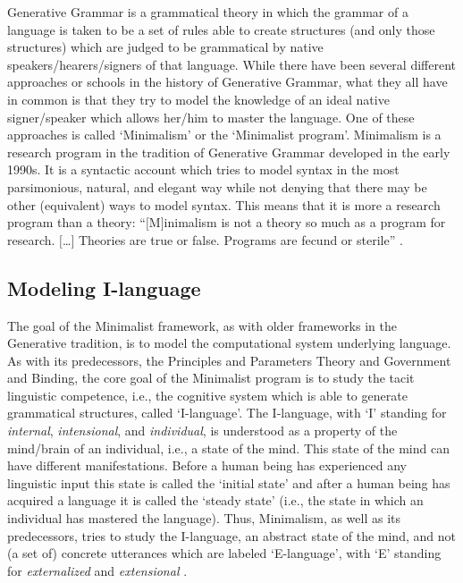 Generative Grammar is a grammatical theory in which the grammar of a language is taken to be a set of rules able to create structures (and only those structures) which are judged to be grammatical by native speakers/hearers/signers of that language. While there have been several different approaches or schools in the history of Generative Grammar, what they all have in common is that they try to model the knowledge of an ideal native signer/speaker which allows her/him to master the language. One of these approaches is called `Minimalism' or the `Minimalist program'. Minimalism is a research program in the tradition of Generative Grammar developed in the early 1990s. It is a syntactic account which tries to model syntax in the most parsimonious, natural, and elegant way while not denying that there may be other (equivalent) ways to model syntax. This means that it is more a research program than a theory: ``$[$M$]$inimalism is not a theory so much as a program for research. $[$\dots $]$ Theories are true or false. Programs are fecund or sterile'' \citep[6]{hornstein2005understanding}.

\subsection{Modeling I-language}
The goal of the Minimalist framework, as with older frameworks in the Generative tradition, is to model the computational system underlying language. As with its predecessors, the Principles and Parameters Theory and Government and Binding, the core goal of the Minimalist program is to study the tacit linguistic competence, i.e., the cognitive system which is able to generate grammatical structures, called `I-language'. The I-language, with `I' standing for \textit{internal}, \textit{intensional}, and \textit{individual}, is understood as a property of the mind/brain of an individual, i.e., a state of the mind. This state of the mind can have different manifestations. Before a human being has experienced any linguistic input this state is called the `initial state' and after a human being has acquired a language it is called the `steady state' (i.e., the state in which an individual has mastered the language). Thus, Minimalism, as well as its predecessors, tries to study the I-language, an abstract state of the mind, and not (a set of) concrete utterances which are labeled `E-language', with `E' standing for \textit{externalized} and \textit{extensional} \citep{chomsky1986barr}.

